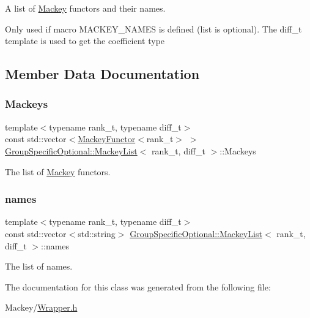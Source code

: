 A list of \hyperlink{namespaceMackey}{Mackey} functors and their names. 

Only used if macro M\+A\+C\+K\+E\+Y\+\_\+\+N\+A\+M\+ES is defined (list is optional). The diff\+\_\+t template is used to get the coefficient type 

\subsection{Member Data Documentation}
\mbox{\label{classGroupSpecificOptional_1_1MackeyList_abffda7eb6d7cd59f7ea8acb8b6eeb88a}} 
\subsubsection{\texorpdfstring{Mackeys}{Mackeys}}
{\footnotesize\ttfamily template$<$typename rank\+\_\+t, typename diff\+\_\+t$>$ \\
const std\+::vector$<$\hyperlink{classMackey_1_1MackeyFunctor}{Mackey\+Functor}$<$rank\+\_\+t$>$ $>$ \hyperlink{classGroupSpecificOptional_1_1MackeyList}{Group\+Specific\+Optional\+::\+Mackey\+List}$<$ rank\+\_\+t, diff\+\_\+t $>$\+::Mackeys\hspace{0.3cm}{\ttfamily [static]}}



The list of \hyperlink{namespaceMackey}{Mackey} functors. 

\mbox{\label{classGroupSpecificOptional_1_1MackeyList_a306cea4e8666fb46637a988b84ea477d}} 
\subsubsection{\texorpdfstring{names}{names}}
{\footnotesize\ttfamily template$<$typename rank\+\_\+t, typename diff\+\_\+t$>$ \\
const std\+::vector$<$std\+::string$>$ \hyperlink{classGroupSpecificOptional_1_1MackeyList}{Group\+Specific\+Optional\+::\+Mackey\+List}$<$ rank\+\_\+t, diff\+\_\+t $>$\+::names\hspace{0.3cm}{\ttfamily [static]}}



The list of names. 



The documentation for this class was generated from the following file\+:\begin{DoxyCompactItemize}
\item 
Mackey/\hyperlink{Wrapper_8h}{Wrapper.\+h}\end{DoxyCompactItemize}
